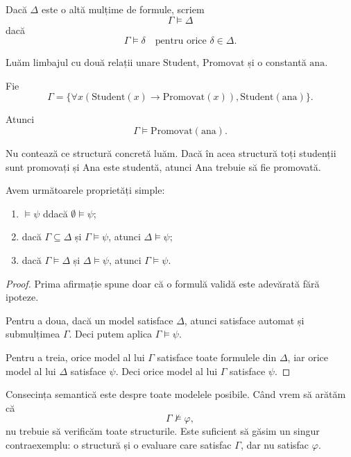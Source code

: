 Dacă \( \Delta \) este o altă mulțime de formule, scriem
\[
	\Gamma \models \Delta
\]
dacă
\[
	\Gamma \models \delta
	\quad \text{pentru orice } \delta \in \Delta.
\]

\begin{eg}
	Luăm limbajul cu două relații unare \( \mathrm{Student} \), \( \mathrm{Promovat} \) și o constantă \( \mathrm{ana} \).

	Fie
	\[
		\Gamma =
		\{
		\forall x(\mathrm{Student}(x) \to \mathrm{Promovat}(x)),
		\mathrm{Student}(\mathrm{ana})
		\}.
	\]

	Atunci
	\[
		\Gamma \models \mathrm{Promovat}(\mathrm{ana}).
	\]

	Nu contează ce structură concretă luăm. Dacă în acea structură toți studenții sunt promovați și Ana este studentă, atunci Ana trebuie să fie promovată.
\end{eg}

\begin{prop}
	Avem următoarele proprietăți simple:
	\begin{enumerate}
		\item \( \models \psi \) ddacă \( \emptyset \models \psi \);
		\item dacă \( \Gamma \subseteq \Delta \) și \( \Gamma \models \psi \), atunci \( \Delta \models \psi \);
		\item dacă \( \Gamma \models \Delta \) și \( \Delta \models \psi \), atunci \( \Gamma \models \psi \).
	\end{enumerate}
\end{prop}

\begin{proof}
	Prima afirmație spune doar că o formulă validă este adevărată fără ipoteze.

	Pentru a doua, dacă un model satisface \( \Delta \), atunci satisface automat și submulțimea \( \Gamma \). Deci putem aplica \( \Gamma \models \psi \).

	Pentru a treia, orice model al lui \( \Gamma \) satisface toate formulele din \( \Delta \), iar orice model al lui \( \Delta \) satisface \( \psi \). Deci orice model al lui \( \Gamma \) satisface \( \psi \).
\end{proof}

\begin{note}
	Consecința semantică este despre toate modelele posibile. Când vrem să arătăm că
	\[
		\Gamma \not\models \varphi,
	\]
	nu trebuie să verificăm toate structurile. Este suficient să găsim un singur contraexemplu: o structură și o evaluare care satisfac \( \Gamma \), dar nu satisfac \( \varphi \).
\end{note}

